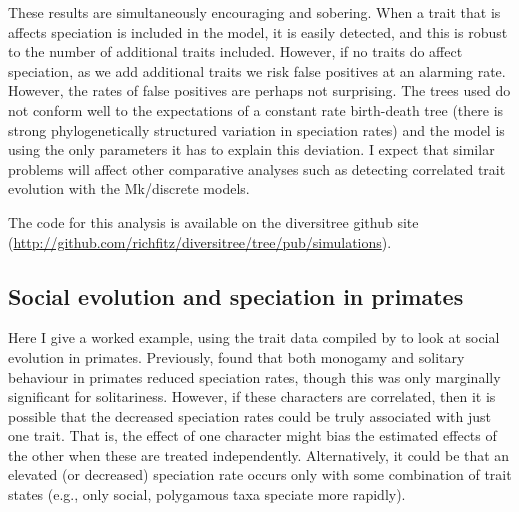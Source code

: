 \documentclass[12pt]{article}
\begin{document}
These results are simultaneously encouraging and sobering.  When a
trait that is affects speciation is included in the model, it is
easily detected, and this is robust to the number of additional traits
included.  However, if no traits do affect speciation, as we add
additional traits we risk false positives at an alarming rate.
%
However, the rates of false positives are perhaps not surprising.  The
trees used do not conform well to the expectations of a constant rate
birth-death tree (there is strong phylogenetically structured
variation in speciation rates) and the model is using the only
parameters it has to explain this deviation.
%
I expect that similar problems will affect other comparative analyses
such as detecting correlated trait evolution with the Mk/discrete
models.

The code for this analysis is available on the diversitree github
site (\url{http://github.com/richfitz/diversitree/tree/pub/simulations}).

\subsection{Social evolution and speciation in primates}
Here I give a worked example, using the trait data compiled by
\citet{Redding-2010-1052} to look at social evolution in primates.
Previously, \citet{Magnuson-Ford-2012} found that both monogamy and
solitary behaviour in primates reduced speciation rates, though this
was only marginally significant for solitariness.  However, if these
characters are correlated, then it is possible that the decreased
speciation rates could be truly associated with just one trait.  That
is, the effect of one character might bias the estimated effects of
the other when these are treated independently.  Alternatively, it
could be that an elevated (or decreased) speciation rate occurs only
with some combination of trait states (e.g., only social, polygamous
taxa speciate more rapidly).
\end{document}
